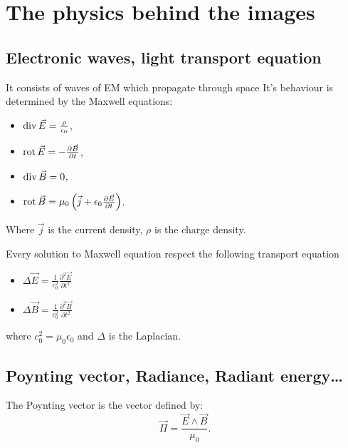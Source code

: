 \section{The physics behind the images}

\subsection{Electronic waves, light transport equation}
\begin{definition}
    \label{def:em_rad}
    It consists of waves of EM which propagate through space
    It's behaviour is determined by the Maxwell equations:
    \begin{itemize}
        \item \(\operatorname{div} \vec E = \frac{\rho}{\epsilon_0}\),
        \item \(\operatorname{rot}\vec E = -\frac{\partial \vec B}{\partial t}\),
        \item \(\operatorname{div} \vec B = 0\),
        \item \(\operatorname{rot} \vec B = \mu_0 \left(\vec j + \epsilon_0 \frac{\partial \vec E}{\partial t}\right)\).
    \end{itemize}
    Where \(\vec j\) is the current density, \(\rho\) is the charge density.
\end{definition}


\begin{theorem}
    Every solution to Maxwell equation respect the following transport equation
    \begin{itemize}
        \item \(\Delta \vec E = \frac{1}{c_0^2} \frac{\partial^2 \vec E}{\partial t^2}\)
        \item \(\Delta \vec B = \frac{1}{c_0^2} \frac{\partial^2 \vec B}{\partial t^2}\)
    \end{itemize}

    where \(c_0^2 = \mu_0\epsilon_0\) and \(\Delta\) is the Laplacian.
\end{theorem}

\subsection{Poynting vector, Radiance, Radiant energy\ldots}
\begin{definition}
    The Poynting vector is the vector defined by:
    \[
        \vec\Pi = \frac{\vec E \wedge \vec B}{\mu_0}.
    \]
\end{definition}

